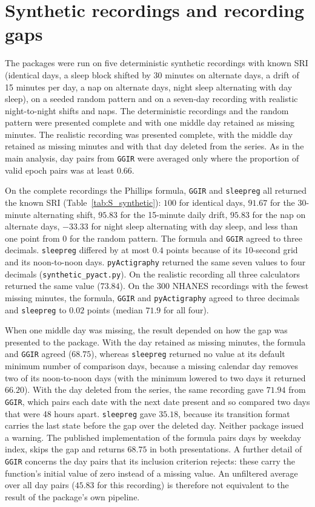 \documentclass[12pt]{article}
\begin{document}
\section{Synthetic recordings and recording gaps}
\label{sec:S_synthetic}
The packages were run on five deterministic synthetic recordings with known SRI (identical days, a sleep block shifted by 30 minutes on alternate days, a drift of 15 minutes per day, a nap on alternate days, night sleep alternating with day sleep), on a seeded random pattern and on a seven-day recording with realistic night-to-night shifts and naps. The deterministic recordings and the random pattern were presented complete and with one middle day retained as missing minutes. The realistic recording was presented complete, with the middle day retained as missing minutes and with that day deleted from the series. As in the main analysis, day pairs from \texttt{GGIR} were averaged only where the proportion of valid epoch pairs was at least 0.66.

On the complete recordings the Phillips formula, \texttt{GGIR} and \texttt{sleepreg} all returned the known SRI (Table~\ref{tab:S_synthetic}): $100$ for identical days, $91.67$ for the 30-minute alternating shift, $95.83$ for the 15-minute daily drift, $95.83$ for the nap on alternate days, $-33.33$ for night sleep alternating with day sleep, and less than one point from $0$ for the random pattern. The formula and \texttt{GGIR} agreed to three decimals. \texttt{sleepreg} differed by at most $0.4$ points because of its 10-second grid and its noon-to-noon days. \texttt{pyActigraphy} returned the same seven values to four decimals (\texttt{synthetic\_pyact.py}). On the realistic recording all three calculators returned the same value ($73.84$). On the 300 NHANES recordings with the fewest missing minutes, the formula, \texttt{GGIR} and \texttt{pyActigraphy} agreed to three decimals and \texttt{sleepreg} to $0.02$ points (median $71.9$ for all four).

When one middle day was missing, the result depended on how the gap was presented to the package. With the day retained as missing minutes, the formula and \texttt{GGIR} agreed ($68.75$), whereas \texttt{sleepreg} returned no value at its default minimum number of comparison days, because a missing calendar day removes two of its noon-to-noon days (with the minimum lowered to two days it returned $66.20$). With the day deleted from the series, the same recording gave $71.94$ from \texttt{GGIR}, which pairs each date with the next date present and so compared two days that were 48 hours apart. \texttt{sleepreg} gave $35.18$, because its transition format carries the last state before the gap over the deleted day. Neither package issued a warning. The published implementation of the formula pairs days by weekday index, skips the gap and returns $68.75$ in both presentations. A further detail of \texttt{GGIR} concerns the day pairs that its inclusion criterion rejects: these carry the function's initial value of zero instead of a missing value. An unfiltered average over all day pairs ($45.83$ for this recording) is therefore not equivalent to the result of the package's own pipeline.
\end{document}
